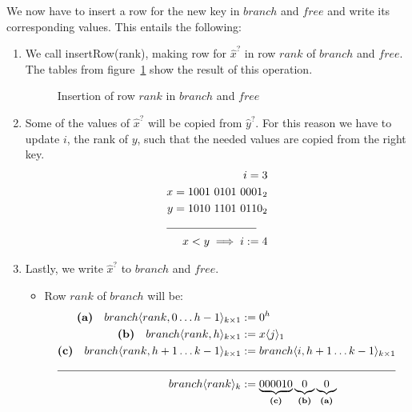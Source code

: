 We now have to insert a row for the new key in $branch$ and $free$ and write its corresponding values. This entails the following:

\begin{enumerate}
    \item
    We call {\ttfamily insertRow(rank)}, making row for $\hat x^?$ in row $rank$ of $branch$ and $free$. The tables from figure~\ref{fig:insertRowRank} show the result of this operation.
    \begin{figure}[H]
    \centering
    
    \caption[Example of $branch$ and $free$ after the insertion of a row]{Insertion of row $rank$ in $branch$ and $free$}
    \label{fig:insertRowRank}
    \end{figure}
    
    \item
    Some of the values of $\hat x^?$ will be copied from $\hat y^?$. For this reason we have to update $i$, the rank of $y$, such that the needed values are copied from the right key.
    \begin{align*}
        i = 3 \\
        x = 1001\ 0101\ 0001_2 \\
        y = 1010\ 1101\ 0110_2 \\
        \cline{1-2}
        x < y \implies i:= 4
    \end{align*}
    
    \item
    Lastly, we write $\hat x^?$ to $branch$ and $free$.
    \begin{itemize}
        \item
        Row $rank$ of $branch$ will be:
        \begin{align*}
            \textbf{(a)}\quad branch\langle rank, 0 \dots h - 1 \rangle_{k \times 1} &:= 0^h\\
            \textbf{(b)}\quad branch\langle rank, h\rangle_{k \times 1} &:= x\langle j \rangle_1\\
            \textbf{(c)}\quad branch\langle rank, h + 1 \dots k - 1\rangle_{k \times 1} &:= branch\langle i, h + 1 \dots k - 1\rangle_{k \times 1}\\
            \cline{1-2}
            branch\langle rank \rangle_k &:=\underbrace{000010}_{\textbf{(c)}} \underbrace{0}_{\textbf{(b)}} \underbrace{0}_{\textbf{(a)}}
        \end{align*}
        

\end{itemize}
\end{enumerate}
